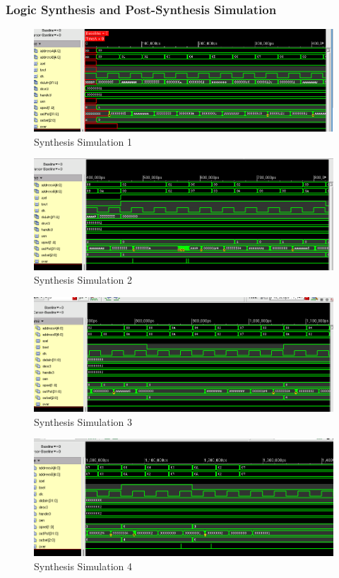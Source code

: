 \documentclass[12pt]{article}
\begin{document}
\subsubsection{Logic Synthesis and Post-Synthesis Simulation}

\begin{figure}[H]
\centering
\includegraphics[width=\linewidth]{../case2/synth1}
\caption{Synthesis Simulation 1}
\label{fig:synth1}
\end{figure}
\begin{figure}[H]
\centering
\includegraphics[width=\linewidth]{../case2/synth2}
\caption{Synthesis Simulation 2}
\label{fig:synth2}
\end{figure}
\begin{figure}[H]
\centering
\includegraphics[width=\linewidth]{../case2/synth3}
\caption{Synthesis Simulation 3}
\label{fig:synth3}
\end{figure}
\begin{figure}[H]
\centering
\includegraphics[width=\linewidth]{../case2/synth4}
\caption{Synthesis Simulation 4}
\label{fig:synth4}
\end{figure}
\end{document}
